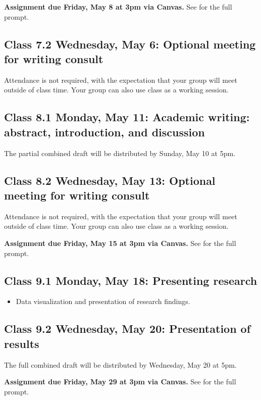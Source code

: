 \documentclass[letterpaper, 12pt, parskip=full, DIV=10]{scrartcl}
\begin{document}
\textbf{Assignment due Friday, May 8 at 3pm via Canvas.}
See  for the full prompt.

\subsection*{Class 7.2 Wednesday, May 6: Optional meeting for writing consult}
Attendance is not required, with the expectation that your group will meet outside of class time. Your group can also use class as a working session.

\subsection*{Class 8.1 Monday, May 11: Academic writing: abstract, introduction, and discussion}

The partial combined draft will be distributed by Sunday, May 10 at 5pm.

\subsection*{Class 8.2 Wednesday, May 13: Optional meeting for writing consult}
Attendance is not required, with the expectation that your group will meet outside of class time. Your group can also use class as a working session.

\textbf{Assignment due Friday, May 15 at 3pm via Canvas.}
See  for the full prompt.

\subsection*{Class 9.1 Monday, May 18: Presenting research}
\begin{itemize}
\item Data visualization and presentation of research findings.
\end{itemize}

\subsection*{Class 9.2 Wednesday, May 20: Presentation of results}
The full combined draft will be distributed by Wednesday, May 20 at 5pm.

\textbf{Assignment due Friday, May 29 at 3pm via Canvas.}
See  for the full prompt.
\end{document}
